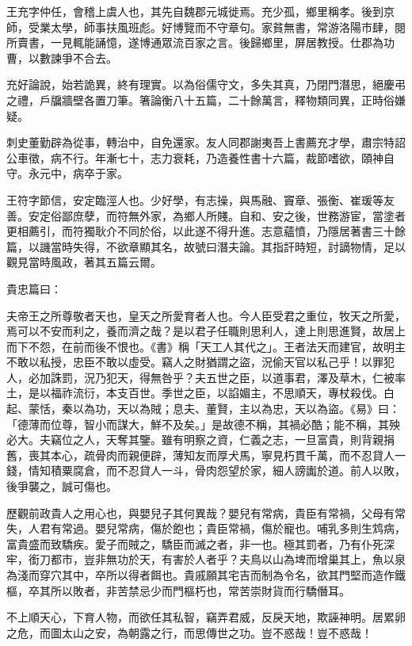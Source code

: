 
\begin{pinyinscope}
王充字仲任，會稽上虞人也，其先自魏郡元城徙焉。充少孤，鄉里稱孝。後到京師，受業太學，師事扶風班彪。好博覽而不守章句。家貧無書，常游洛陽市肆，閱所賣書，一見輒能誦憶，遂博通眾流百家之言。後歸鄉里，屏居教授。仕郡為功曹，以數諫爭不合去。

充好論說，始若詭異，終有理實。以為俗儒守文，多失其真，乃閉門潛思，絕慶弔之禮，戶牖牆壁各置刀筆。箸論衡八十五篇，二十餘萬言，釋物類同異，正時俗嫌疑。

刺史董勤辟為從事，轉治中，自免還家。友人同郡謝夷吾上書薦充才學，肅宗特詔公車徵，病不行。年漸七十，志力衰耗，乃造養性書十六篇，裁節嗜欲，頤神自守。永元中，病卒于家。

王符字節信，安定臨涇人也。少好學，有志操，與馬融、竇章、張衡、崔瑗等友善。安定俗鄙庶孽，而符無外家，為鄉人所賤。自和、安之後，世務游宦，當塗者更相薦引，而符獨耿介不同於俗，以此遂不得升進。志意蘊憤，乃隱居著書三十餘篇，以譏當時失得，不欲章顯其名，故號曰潛夫論。其指訐時短，討謫物情，足以觀見當時風政，著其五篇云爾。

貴忠篇曰：

夫帝王之所尊敬者天也，皇天之所愛育者人也。今人臣受君之重位，牧天之所愛，焉可以不安而利之，養而濟之哉？是以君子任職則思利人，達上則思進賢，故居上而下不怨，在前而後不恨也。《書》稱「天工人其代之」。王者法天而建官，故明主不敢以私授，忠臣不敢以虛受。竊人之財猶謂之盜，況偷天官以私己乎！以罪犯人，必加誅罰，況乃犯天，得無咎乎？夫五世之臣，以道事君，澤及草木，仁被率土，是以福祚流衍，本支百世。季世之臣，以諂媚主，不思順天，專杖殺伐。白起、蒙恬，秦以為功，天以為賊；息夫、董賢，主以為忠，天以為盜。《易》曰：「德薄而位尊，智小而謀大，鮮不及矣。」是故德不稱，其禍必酷；能不稱，其殃必大。夫竊位之人，天奪其鑒。雖有明察之資，仁義之志，一旦富貴，則背親捐舊，喪其本心，疏骨肉而親便辟，薄知友而厚犬馬，寧見朽貫千萬，而不忍貸人一錢，情知積粟腐倉，而不忍貸人一斗，骨肉怨望於家，細人謗讟於道。前人以敗，後爭襲之，誠可傷也。

歷觀前政貴人之用心也，與嬰兒子其何異哉？嬰兒有常病，貴臣有常禍，父母有常失，人君有常過。嬰兒常病，傷於飽也；貴臣常禍，傷於寵也。哺乳多則生鸩病，富貴盛而致驕疾。愛子而賊之，驕臣而滅之者，非一也。極其罰者，乃有仆死深牢，銜刀都巿，豈非無功於天，有害於人者乎？夫鳥以山為埤而增巢其上，魚以泉為淺而穿穴其中，卒所以得者餌也。貴戚願其宅吉而制為令名，欲其門堅而造作鐵樞，卒其所以敗者，非苦禁忌少而門樞朽也，常苦崇財貨而行驕僭耳。

不上順天心，下育人物，而欲任其私智，竊弄君威，反戾天地，欺誣神明。居累卵之危，而圖太山之安，為朝露之行，而思傳世之功。豈不惑哉！豈不惑哉！


\end{pinyinscope}
